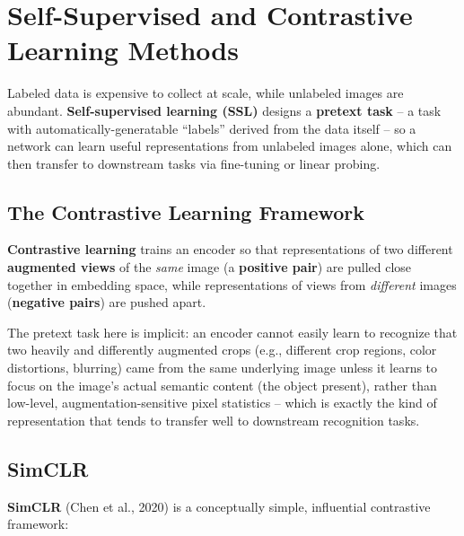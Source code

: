 \documentclass[12pt,a4paper]{article}
\begin{document}
\newpage

\section{Self-Supervised and Contrastive Learning Methods}

Labeled data is expensive to collect at scale, while unlabeled images are abundant. \textbf{Self-supervised learning (SSL)} designs a \textbf{pretext task} -- a task with automatically-generatable ``labels'' derived from the data itself -- so a network can learn useful representations from unlabeled images alone, which can then transfer to downstream tasks via fine-tuning or linear probing.

\subsection{The Contrastive Learning Framework}

\begin{defbox}
\textbf{Contrastive learning} trains an encoder so that representations of two different \textbf{augmented views} of the \emph{same} image (a \textbf{positive pair}) are pulled close together in embedding space, while representations of views from \emph{different} images (\textbf{negative pairs}) are pushed apart.
\end{defbox}

\begin{keyidea}
The pretext task here is implicit: an encoder cannot easily learn to recognize that two heavily and differently augmented crops (e.g., different crop regions, color distortions, blurring) came from the same underlying image unless it learns to focus on the image's actual semantic content (the object present), rather than low-level, augmentation-sensitive pixel statistics -- which is exactly the kind of representation that tends to transfer well to downstream recognition tasks.
\end{keyidea}

\subsection{SimCLR}

\textbf{SimCLR} (Chen et al., 2020) is a conceptually simple, influential contrastive framework:
\end{document}
